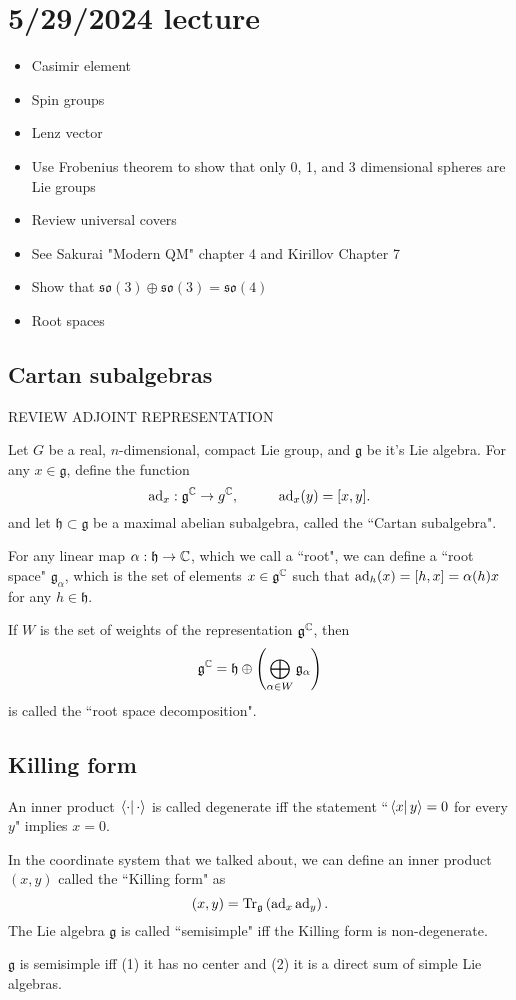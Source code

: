 \documentclass[class=article, crop=false]{standalone}
\begin{document}
\section{5/29/2024 lecture}
\begin{itemize}
    \item Casimir element
    \item Spin groups
    \item Lenz vector
    \item Use Frobenius theorem to show that only 0, 1, and 3 dimensional spheres are Lie groups
    \item Review universal covers
    \item See Sakurai "Modern QM" chapter 4 and Kirillov Chapter 7
    \item Show that $\mathfrak{so}(3) \oplus \mathfrak{so}(3) = \mathfrak{so}(4)$
    \item Root spaces
\end{itemize}

\subsection{Cartan subalgebras}
REVIEW ADJOINT REPRESENTATION
\par
Let $G$ be a real, $n$-dimensional, compact Lie group, and $\mathfrak{g}$ be it's Lie algebra. For any $x \in \mathfrak{g}$, define the function
\[ \operatorname{ad}_x : \mathfrak{g}^{\mathbb{C}} \rightarrow g^{\mathbb{C}}, \hspace{1cm} \operatorname{ad}_x(y)=[x,y]. \]
and let $\mathfrak{h} \subset \mathfrak{g}$ be a maximal abelian subalgebra, called the ``Cartan subalgebra".
\par
For any linear map $\alpha: \mathfrak{h} \rightarrow \mathbb{C}$, which we call a ``root", we can define a ``root space" $\mathfrak{g}_\alpha$, which is the set of elements $x \in \mathfrak{g}^{\mathbb{C}}$ such that $\operatorname{ad}_h(x)=[h,x]=\alpha(h)x$ for any $h \in \mathfrak{h}$.
\par
If $W$ is the set of weights of the representation $\mathfrak{g}^{\mathbb{C}}$, then
\[ \mathfrak{g}^{\mathbb{C}} = \mathfrak{h}\oplus \left( \bigoplus_{\alpha \in W} \mathfrak{g}_\alpha \right) \]
is called the ``root space decomposition".

\subsection{Killing form}
An inner product $ \left.\left\langle \cdot\right\vert \cdot \right\rangle $ is called degenerate iff the statement ``$ \left.\left\langle x\right\vert y \right\rangle =0$ for every $y$" implies $x=0$.
\par
In the coordinate system that we talked about, we can define an inner product $(x, y)$ called the ``Killing form" as
\[ (x,y) = \operatorname{Tr}_\mathfrak{g} \left( \operatorname{ad}_x \operatorname{ad}_y \right). \]
The Lie algebra $\mathfrak{g}$ is called ``semisimple" iff the Killing form is non-degenerate.
\begin{thm}
    $\mathfrak{g}$ is semisimple iff (1) it has no center and (2) it is a direct sum of simple Lie algebras.
\end{thm}
\end{document}
